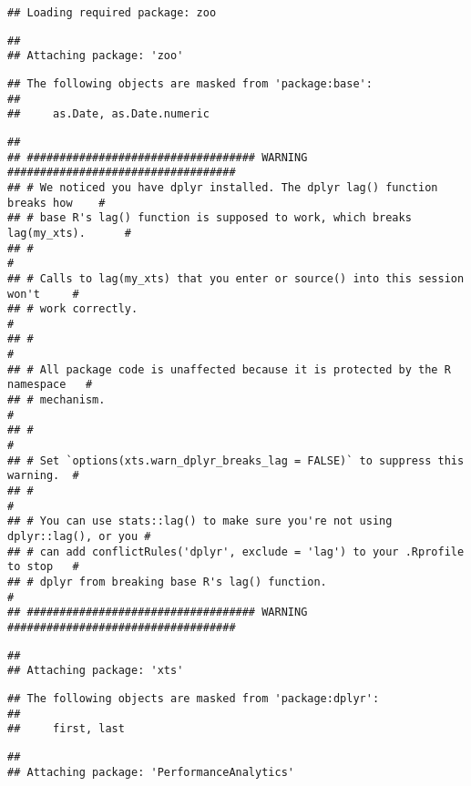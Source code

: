 \documentclass[
]{article}
\begin{document}
\begin{verbatim}
## Loading required package: zoo
\end{verbatim}

\begin{verbatim}
## 
## Attaching package: 'zoo'
\end{verbatim}

\begin{verbatim}
## The following objects are masked from 'package:base':
## 
##     as.Date, as.Date.numeric
\end{verbatim}

\begin{verbatim}
## 
## ################################### WARNING ###################################
## # We noticed you have dplyr installed. The dplyr lag() function breaks how    #
## # base R's lag() function is supposed to work, which breaks lag(my_xts).      #
## #                                                                             #
## # Calls to lag(my_xts) that you enter or source() into this session won't     #
## # work correctly.                                                             #
## #                                                                             #
## # All package code is unaffected because it is protected by the R namespace   #
## # mechanism.                                                                  #
## #                                                                             #
## # Set `options(xts.warn_dplyr_breaks_lag = FALSE)` to suppress this warning.  #
## #                                                                             #
## # You can use stats::lag() to make sure you're not using dplyr::lag(), or you #
## # can add conflictRules('dplyr', exclude = 'lag') to your .Rprofile to stop   #
## # dplyr from breaking base R's lag() function.                                #
## ################################### WARNING ###################################
\end{verbatim}

\begin{verbatim}
## 
## Attaching package: 'xts'
\end{verbatim}

\begin{verbatim}
## The following objects are masked from 'package:dplyr':
## 
##     first, last
\end{verbatim}

\begin{verbatim}
## 
## Attaching package: 'PerformanceAnalytics'
\end{verbatim}
\end{document}
